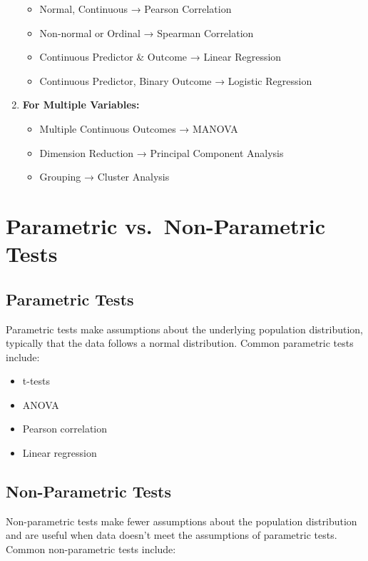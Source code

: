 \documentclass[
  letterpaper,
]{book}
\providecommand{\tightlist}{%
  \setlength{\itemsep}{0pt}\setlength{\parskip}{0pt}}
\begin{document}
\begin{enumerate}
  \begin{itemize}
  \tightlist
  \item
    Normal, Continuous → Pearson Correlation
  \item
    Non-normal or Ordinal → Spearman Correlation
  \item
    Continuous Predictor \& Outcome → Linear Regression
  \item
    Continuous Predictor, Binary Outcome → Logistic Regression
  \end{itemize}
\item
  \textbf{For Multiple Variables:}

  \begin{itemize}
  \tightlist
  \item
    Multiple Continuous Outcomes → MANOVA
  \item
    Dimension Reduction → Principal Component Analysis
  \item
    Grouping → Cluster Analysis
  \end{itemize}
\end{enumerate}

\section{Parametric vs.~Non-Parametric
Tests}\label{parametric-vs.-non-parametric-tests}

\subsection{Parametric Tests}\label{parametric-tests}

Parametric tests make assumptions about the underlying population
distribution, typically that the data follows a normal distribution.
Common parametric tests include:

\begin{itemize}
\tightlist
\item
  t-tests
\item
  ANOVA
\item
  Pearson correlation
\item
  Linear regression
\end{itemize}

\subsection{Non-Parametric Tests}\label{non-parametric-tests-1}

Non-parametric tests make fewer assumptions about the population
distribution and are useful when data doesn't meet the assumptions of
parametric tests. Common non-parametric tests include:
\end{document}

